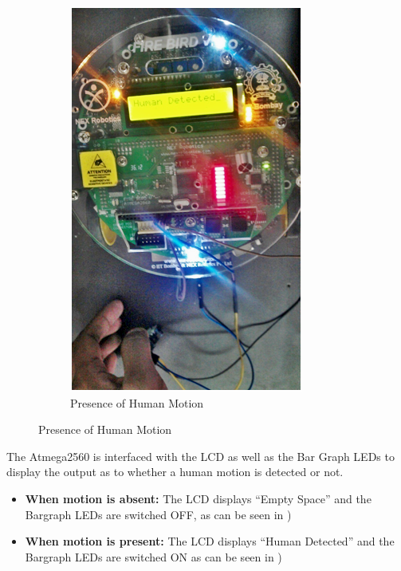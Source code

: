 \documentclass[a4paper,12 pt]{article}
\begin{document}
\begin{figure}[h]
        \begin{subfigure}[b]{0.45\textwidth}
                \includegraphics[width=\textwidth]{out2.png}
                \caption{Presence of Human Motion}
                \label{fig:9b}
        \end{subfigure}
        
\end{figure}

The Atmega2560 is interfaced with the LCD as well as the Bar Graph LEDs to display the output as to whether a human motion is detected or not.
\begin{itemize}
\item \textbf{When motion is absent:}
The LCD displays “Empty Space” and the Bargraph LEDs are switched OFF, as can be seen in  )

\item \textbf{When motion is present:}
The LCD displays “Human Detected” and the Bargraph LEDs are switched ON as can be seen in )
\end{itemize}
\pagebreak
\end{document}
